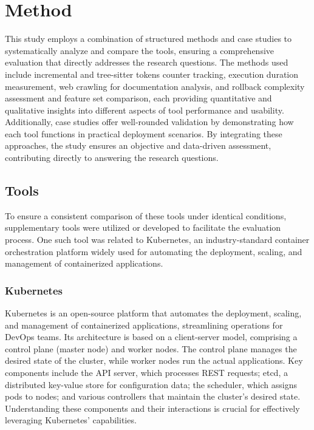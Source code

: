 \documentclass{article}
\begin{document}
\section{Method}
\label{sec:method}

This study employs a combination of structured methods and case studies to systematically analyze and compare the tools, ensuring a comprehensive evaluation that directly addresses the research questions. The methods used include incremental and tree-sitter tokens counter tracking, execution duration measurement, web crawling for documentation analysis, and rollback complexity assessment and feature set comparison, each providing quantitative and qualitative insights into different aspects of tool performance and usability. Additionally, case studies offer well-rounded validation by demonstrating how each tool functions in practical deployment scenarios. By integrating these approaches, the study ensures an objective and data-driven assessment, contributing directly to answering the research questions.

\subsection{Tools}
\label{sec:tools}

To ensure a consistent comparison of these tools under identical conditions, supplementary tools were utilized or developed to facilitate the evaluation process. One such tool was related to Kubernetes, an industry-standard container orchestration platform widely used for automating the deployment, scaling, and management of containerized applications.

\subsubsection{Kubernetes}
\label{sec:kubernetes}

Kubernetes is an open-source platform that automates the deployment, scaling, and management of containerized applications, streamlining operations for DevOps teams. Its architecture is based on a client-server model, comprising a control plane (master node) and worker nodes. The control plane manages the desired state of the cluster, while worker nodes run the actual applications. Key components include the API server, which processes REST requests; etcd, a distributed key-value store for configuration data; the scheduler, which assigns pods to nodes; and various controllers that maintain the cluster's desired state. Understanding these components and their interactions is crucial for effectively leveraging Kubernetes' capabilities. \cite{k8s-1} \cite{k8s-2}
\end{document}
